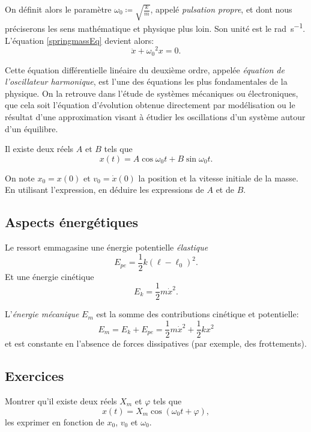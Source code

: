 \documentclass{article}
\renewcommand\phi\varphi
\theoremstyle{definition}
\begin{document}
On définit alors le paramètre $\omega_0\coloneqq \sqrt{\frac{k}{m}}$, appelé \textit{pulsation propre}, et dont nous préciserons les sens mathématique et physique plus loin. Son unité est le \si{\radian\per\second}. L'équation \eqref{springmassEq} devient alors:
    \begin{equation}
        \ddot{x} + {\omega_0}^2x = 0.
    \end{equation}

Cette équation différentielle linéaire du deuxième ordre, appelée \textit{équation de l'oscillateur harmonique}, est l'une des équations les plus fondamentales de la physique. On la retrouve dans l'étude de systèmes mécaniques ou électroniques, que cela soit l'équation d'évolution obtenue directement par modélisation ou le résultat d'une approximation visant à étudier les oscillations d'un système autour d'un équilibre.

Il existe deux réels $A$ et $B$ tels que
	\begin{equation*}
	x(t) = A\cos\omega_0 t + B\sin\omega_0 t.
	\end{equation*}

On note $x_0=x(0)$ et $v_0=\dot{x}(0)$ la position et la vitesse initiale de la masse. En utilisant l'expression, en déduire les expressions de $A$ et de $B$.

\subsection{Aspects énergétiques}

Le ressort emmagasine une énergie potentielle \textit{élastique}
\[
E_{pe} = \frac{1}{2}k{(\ell-\ell_0)}^2.
\]
Et une énergie cinétique
\[
E_k = \frac{1}{2}m\dot{x}^2.
\]

L'\textit{énergie mécanique} $E_m$ est la somme des contributions cinétique et potentielle:
\begin{equation}
	E_m = E_k + E_{pe} = \frac{1}{2}m\dot{x}^2 + \frac{1}{2}kx^2
\end{equation}
et est constante en l'absence de forces dissipatives (par exemple, des frottements).

\subsection{Exercices}

\begin{exo}
	Montrer qu'il existe deux réels $X_m$ et $\phi$ tels que 
	\[x(t)=X_m\cos(\omega_0t+\phi),\]
	les exprimer en fonction de $x_0$, $v_0$ et $\omega_0$.
\end{exo}
\end{document}
